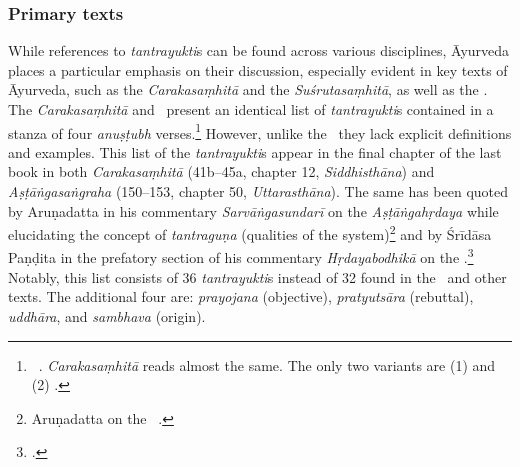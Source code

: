 \subsubsection{Primary texts} While references to \emph{tantrayukti}s
can be found across various disciplines, Āyurveda places a particular
emphasis on their discussion, especially evident in key texts of
Āyurveda, such as the \emph{Carakasaṃhitā} and the
\emph{Suśrutasaṃhitā}, as well as the \AS. The \emph{Carakasaṃhitā}
and \AS\ present an identical list of \emph{tantrayukti}s contained in
a stanza of four \emph{anuṣṭubh} verses.\footnote{\label{CaAsT}
	\begin{verse}
	\end{verse}
	\AS\ . \emph{Carakasaṃhitā} 
 reads almost the same. The only two variants are (1) 
 and (2) .
	} 
However, unlike the \SS\ they lack explicit definitions and examples. 
This list of the \emph{tantrayukti}s appear in the final chapter of the last book 
in both \emph{Carakasaṃhitā} (41b--45a, chapter 12, \emph{Siddhisthāna}) 
and 
\emph{Aṣṭāṅgasaṅgraha} (150--153, chapter 50, \emph{Uttarasthāna}). 
The same has been quoted by Aruṇadatta in his commentary 
\emph{Sarvāṅgasundarī} on the \emph{Aṣṭāṅgahṛdaya} 
while elucidating the concept of \emph{tantraguṇa} (qualities of the 
system)\footnote{Aruṇadatta on the \AHS\ .}  
and by Śrīdāsa Paṇḍita in the prefatory section of his commentary 
\emph{Hṛdayabodhikā} on the \AHS.\footcite[1--2]{muss-1940}
Notably, this list consists of 36 \emph{tantrayukti}s instead of 32 found in the 
\SS\ and other texts. The additional four are: \emph{prayojana} (objective), 
\emph{pratyutsāra} (rebuttal), \emph{uddhāra}, and \emph{sambhava} 
(origin). 


